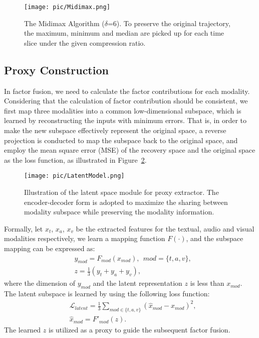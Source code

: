 \documentclass{article}
\begin{document}
\begin{figure}[!t]
	\centering
	\texttt{[image: pic/Midimax.png]}
	\caption{The Midimax Algorithm ($\delta$=6). To preserve the original trajectory, the maximum, minimum and median are picked up for each time slice under the given compression ratio.}
	\label{fig:midimax}
\end{figure}

\subsection{Proxy Construction}
In factor fusion, we need to calculate the factor contributions for each modality.
Considering that the calculation of factor contribution should be consistent, we first map three modalities into a common low-dimensional subspace, which is learned by reconstructing the inputs with minimum errors.
That is, in order to make the new subspace effectively represent the original space, a reverse projection is conducted to map the subspace back to the original space, and employ the mean square error (MSE) of the recovery space and the original space as the loss function, as illustrated in Figure~\ref{fig:latent}.

\begin{figure}[!t]
	\centering
	\texttt{[image: pic/LatentModel.png]}
	\caption{Illustration of the latent space module for proxy extractor. The encoder-decoder form is adopted to maximize the sharing between modality subspace while preserving the modality information.}
	\label{fig:latent}
\end{figure}
		
Formally, let $x_{t}$, $x_{a}$, $x_{v}$ be the extracted features for the textual, audio and visual modalities respectively, we learn a mapping function $F(\cdot)$, and the subspace mapping can be expressed as:
\begin{equation}
    \begin{split}
	& y_{mod} = F_{mod}(x_{mod}),\ \ mod=\{t,a,v\},\\
	& z=\frac{1}{3}(y_{t} + y_{a} + y_{v}),
	\end{split}
\end{equation}
where the dimension of $y_{mod}$ and the latent representation $z$ is less than $x_{mod}$. The latent subspace is learned by using the following loss function:
\begin{equation}
    \begin{split}
	& \mathcal L_{latent} = \frac{1}{3} \sum_{mod\in \{t,a,v\}}(\hat{x}_{mod} - x_{mod})^2,\\
	& \hat{x}_{mod} = F'_{mod}(z).
	\end{split}
\end{equation}
The learned $z$ is utilized as a proxy to guide the subsequent factor fusion.
\end{document}
